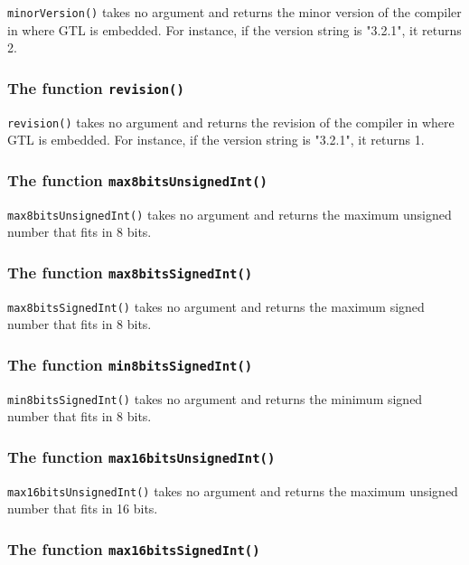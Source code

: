 \documentclass[10pt,openright,twosides]{report}
\newcommand{\icst}[1]{{\footnotesize\ttfamily\colorbox{light-blue}{#1}}}
\newcommand{\scst}[1]{{\footnotesize\ttfamily\colorbox{light-blue}{"#1"}}}
\newcommand{\gtlinline}[1]{\colorbox{light-blue}{\lstinline[language=gtl]{#1}}}
\begin{document}
\gtlinline{minorVersion()} takes no argument and returns the minor version of the compiler in where GTL is embedded. For instance, if the version string is \scst{3.2.1}, it returns \icst{2}.

\subsubsection{The function \texttt{revision()}}

\gtlinline{revision()} takes no argument and returns the revision of the compiler in where GTL is embedded. For instance, if the version string is \scst{3.2.1}, it returns \icst{1}.

\subsubsection{The function \texttt{max8bitsUnsignedInt()}}

\gtlinline{max8bitsUnsignedInt()} takes no argument and returns the maximum unsigned number that fits in 8 bits.

\subsubsection{The function \texttt{max8bitsSignedInt()}}

\gtlinline{max8bitsSignedInt()} takes no argument and returns the maximum signed number that fits in 8 bits.

\subsubsection{The function \texttt{min8bitsSignedInt()}}

\gtlinline{min8bitsSignedInt()} takes no argument and returns the minimum signed number that fits in 8 bits.

\subsubsection{The function \texttt{max16bitsUnsignedInt()}}

\gtlinline{max16bitsUnsignedInt()} takes no argument and returns the maximum unsigned number that fits in 16 bits.

\subsubsection{The function \texttt{max16bitsSignedInt()}}
\end{document}
